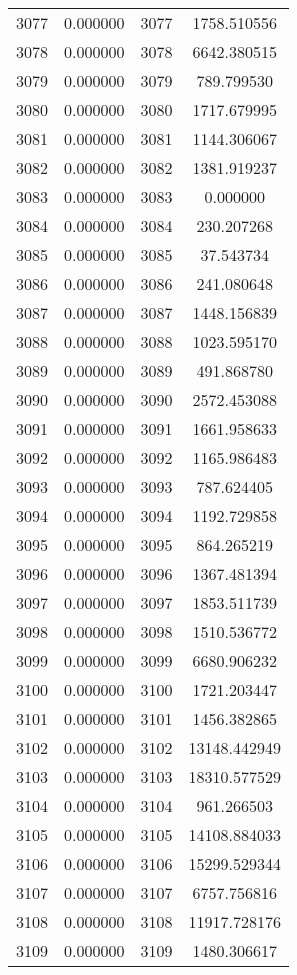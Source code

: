 \documentclass[12pt]{article}
\begin{document}
\begin{longtable}{@{}cccc@{}}
3077 & 0.000000 & 3077 & 1758.510556 \\
3078 & 0.000000 & 3078 & 6642.380515 \\
3079 & 0.000000 & 3079 & 789.799530 \\
3080 & 0.000000 & 3080 & 1717.679995 \\
3081 & 0.000000 & 3081 & 1144.306067 \\
3082 & 0.000000 & 3082 & 1381.919237 \\
3083 & 0.000000 & 3083 & 0.000000 \\
3084 & 0.000000 & 3084 & 230.207268 \\
3085 & 0.000000 & 3085 & 37.543734 \\
3086 & 0.000000 & 3086 & 241.080648 \\
3087 & 0.000000 & 3087 & 1448.156839 \\
3088 & 0.000000 & 3088 & 1023.595170 \\
3089 & 0.000000 & 3089 & 491.868780 \\
3090 & 0.000000 & 3090 & 2572.453088 \\
3091 & 0.000000 & 3091 & 1661.958633 \\
3092 & 0.000000 & 3092 & 1165.986483 \\
3093 & 0.000000 & 3093 & 787.624405 \\
3094 & 0.000000 & 3094 & 1192.729858 \\
3095 & 0.000000 & 3095 & 864.265219 \\
3096 & 0.000000 & 3096 & 1367.481394 \\
3097 & 0.000000 & 3097 & 1853.511739 \\
3098 & 0.000000 & 3098 & 1510.536772 \\
3099 & 0.000000 & 3099 & 6680.906232 \\
3100 & 0.000000 & 3100 & 1721.203447 \\
3101 & 0.000000 & 3101 & 1456.382865 \\
3102 & 0.000000 & 3102 & 13148.442949 \\
3103 & 0.000000 & 3103 & 18310.577529 \\
3104 & 0.000000 & 3104 & 961.266503 \\
3105 & 0.000000 & 3105 & 14108.884033 \\
3106 & 0.000000 & 3106 & 15299.529344 \\
3107 & 0.000000 & 3107 & 6757.756816 \\
3108 & 0.000000 & 3108 & 11917.728176 \\
3109 & 0.000000 & 3109 & 1480.306617 \\

\end{longtable}
\end{document}
